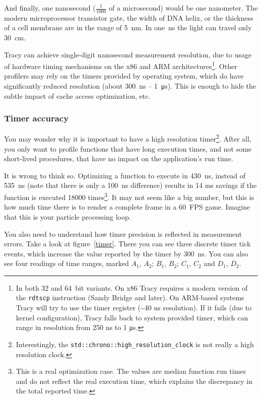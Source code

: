 \documentclass[hidelinks,titlepage,a4paper]{article}
\begin{document}
And finally, one nanosecond ($\frac{1}{1000}$ of a microsecond) would be one nanometer. The modern microprocessor transistor gate, the width of DNA helix, or the thickness of a cell membrane are in the range of 5~\si{\nano\metre}. In one~\si{\nano\second} the light can travel only 30~\si{\centi\meter}.

Tracy can achieve single-digit nanosecond measurement resolution, due to usage of hardware timing mechanisms on the x86 and ARM architectures\footnote{In both 32 and 64~bit variants. On x86 Tracy requires a modern version of the \texttt{rdtscp} instruction (Sandy Bridge and later). On ARM-based systems Tracy will try to use the timer register (\textasciitilde 40 \si{\nano\second} resolution). If it fails (due to kernel configuration), Tracy falls back to system provided timer, which can range in resolution from 250 \si{\nano\second} to 1 \si{\micro\second}.}. Other profilers may rely on the timers provided by operating system, which do have significantly reduced resolution (about 300~\si{\nano\second} -- 1~\si{\micro\second}). This is enough to hide the subtle impact of cache access optimization, etc.

\subsubsection{Timer accuracy}

You may wonder why it is important to have a high resolution timer\footnote{Interestingly, the \texttt{std::chrono::high\_resolution\_clock} is not really a high resolution clock.}. After all, you only want to profile functions that have long execution times, and not some short-lived procedures, that have no impact on the application's run time.

It is wrong to think so. Optimizing a function to execute in 430~\si{\nano\second}, instead of 535~\si{\nano\second} (note that there is only a 100~\si{\nano\second} difference) results in 14 \si{\milli\second} savings if the function is executed 18000 times\footnote{This is a real optimization case. The values are median function run times and do not reflect the real execution time, which explains the discrepancy in the total reported time.}. It may not seem like a big number, but this is how much time there is to render a complete frame in a 60~FPS game. Imagine that this is your particle processing loop.

You also need to understand how timer precision is reflected in measurement errors. Take a look at figure~\ref{timer}. There you can see three discrete timer tick events, which increase the value reported by the timer by 300~\si{\nano\second}. You can also see four readings of time ranges, marked $A_1$, $A_2$; $B_1$, $B_2$; $C_1$, $C_2$ and $D_1$, $D_2$.
\end{document}
